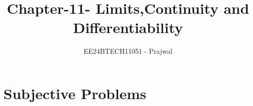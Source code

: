 \documentclass[journal,12pt,twocolumn]{IEEEtran}
\theoremstyle{remark}
\begin{document}

\vspace{3cm}

\title{Chapter-11-
        Limits,Continuity and  Differentiability}
\author{EE24BTECH11051 - Prajwal}
\maketitle
\newpage
\bigskip

\renewcommand{\thefigure}{\theenumi}
\renewcommand{\thetable}{\theenumi}


\section{Subjective Problems}
   


\begin{enumerate}


\end{enumerate}
\end{document}
